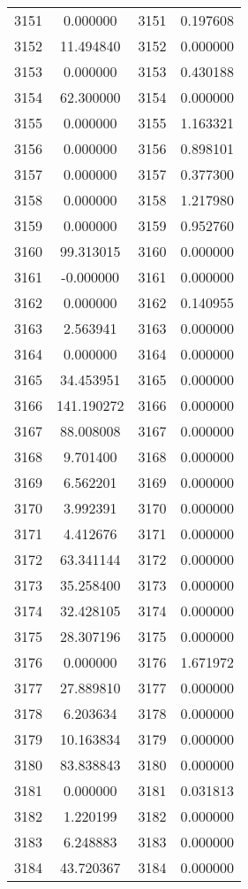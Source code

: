 \documentclass[12pt]{article}
\begin{document}
\begin{longtable}{@{}cccc@{}}
3151 & 0.000000 & 3151 & 0.197608 \\
3152 & 11.494840 & 3152 & 0.000000 \\
3153 & 0.000000 & 3153 & 0.430188 \\
3154 & 62.300000 & 3154 & 0.000000 \\
3155 & 0.000000 & 3155 & 1.163321 \\
3156 & 0.000000 & 3156 & 0.898101 \\
3157 & 0.000000 & 3157 & 0.377300 \\
3158 & 0.000000 & 3158 & 1.217980 \\
3159 & 0.000000 & 3159 & 0.952760 \\
3160 & 99.313015 & 3160 & 0.000000 \\
3161 & -0.000000 & 3161 & 0.000000 \\
3162 & 0.000000 & 3162 & 0.140955 \\
3163 & 2.563941 & 3163 & 0.000000 \\
3164 & 0.000000 & 3164 & 0.000000 \\
3165 & 34.453951 & 3165 & 0.000000 \\
3166 & 141.190272 & 3166 & 0.000000 \\
3167 & 88.008008 & 3167 & 0.000000 \\
3168 & 9.701400 & 3168 & 0.000000 \\
3169 & 6.562201 & 3169 & 0.000000 \\
3170 & 3.992391 & 3170 & 0.000000 \\
3171 & 4.412676 & 3171 & 0.000000 \\
3172 & 63.341144 & 3172 & 0.000000 \\
3173 & 35.258400 & 3173 & 0.000000 \\
3174 & 32.428105 & 3174 & 0.000000 \\
3175 & 28.307196 & 3175 & 0.000000 \\
3176 & 0.000000 & 3176 & 1.671972 \\
3177 & 27.889810 & 3177 & 0.000000 \\
3178 & 6.203634 & 3178 & 0.000000 \\
3179 & 10.163834 & 3179 & 0.000000 \\
3180 & 83.838843 & 3180 & 0.000000 \\
3181 & 0.000000 & 3181 & 0.031813 \\
3182 & 1.220199 & 3182 & 0.000000 \\
3183 & 6.248883 & 3183 & 0.000000 \\
3184 & 43.720367 & 3184 & 0.000000 \\

\end{longtable}
\end{document}
